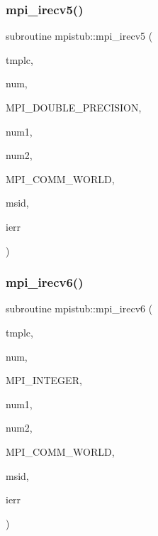 \subsubsection{\texorpdfstring{mpi\_irecv5()}{mpi\_irecv5()}}
{\footnotesize\ttfamily subroutine mpistub\+::mpi\+\_\+irecv5 (\begin{DoxyParamCaption}\item[{double precision, dimension(\+:,\+:,\+:)}]{tmplc,  }\item[{}]{num,  }\item[{}]{M\+P\+I\+\_\+\+D\+O\+U\+B\+L\+E\+\_\+\+P\+R\+E\+C\+I\+S\+I\+ON,  }\item[{}]{num1,  }\item[{}]{num2,  }\item[{}]{M\+P\+I\+\_\+\+C\+O\+M\+M\+\_\+\+W\+O\+R\+LD,  }\item[{}]{msid,  }\item[{}]{ierr }\end{DoxyParamCaption})}

\mbox{\label{namespacempistub_a38d4bf89b91c8dac22d310c6e73ced41}} 
\subsubsection{\texorpdfstring{mpi\_irecv6()}{mpi\_irecv6()}}
{\footnotesize\ttfamily subroutine mpistub\+::mpi\+\_\+irecv6 (\begin{DoxyParamCaption}\item[{integer, dimension(\+:)}]{tmplc,  }\item[{}]{num,  }\item[{}]{M\+P\+I\+\_\+\+I\+N\+T\+E\+G\+ER,  }\item[{}]{num1,  }\item[{}]{num2,  }\item[{}]{M\+P\+I\+\_\+\+C\+O\+M\+M\+\_\+\+W\+O\+R\+LD,  }\item[{}]{msid,  }\item[{}]{ierr }\end{DoxyParamCaption})}

\mbox{\label{namespacempistub_a2aebc613876246484fb3daea092c2abe}} 
